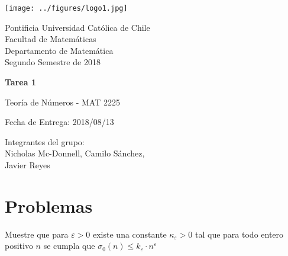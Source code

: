 


\begin{minipage}{2.5cm}
	\texttt{[image: ../figures/logo1.jpg]}
\end{minipage}
\begin{minipage}{13cm}
	\begin{flushleft}
		\raggedright
		{
			\noindent
			{\sc Pontificia Universidad Católica de Chile\\
				Facultad de Matemáticas\\
				Departamento de Matemática} \smallskip \\
			Segundo Semestre de 2018\\
		}
	\end{flushleft}
\end{minipage}

\vspace{2ex}
{\Large \centerline{\bf Tarea 1}}
{\large \centerline{Teoría de Números - MAT 2225}}
\centerline{Fecha de Entrega: 2018/08/13}

\begin{flushright}
	Integrantes del grupo:\\
	Nicholas Mc-Donnell, Camilo Sánchez,\\
	Javier Reyes
\end{flushright}

\section{Problemas}

\begin{prob}[3 pts.]
	Muestre que para $\varepsilon>0$ existe una constante $\kappa_\varepsilon>0$ tal que para todo entero positivo $n$ se cumpla que $\sigma_0(n)\leq k_\varepsilon\cdot n^\varepsilon$
\end{prob}

